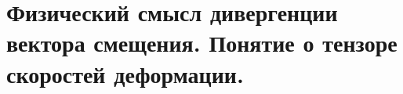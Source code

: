 \chapter{Физический смысл дивергенции вектора смещения. Понятие о тензоре
скоростей деформации.}

\newpage
